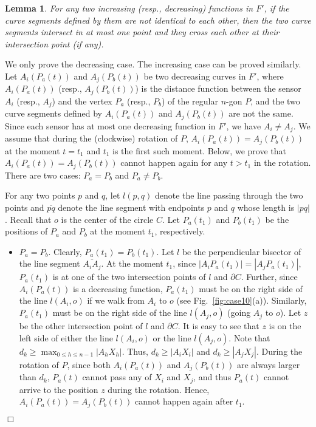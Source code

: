 \documentclass[11pt]{article}
\newenvironment{proof}{\noindent {\textbf{Proof:}}\rm}{\hfill $\Box$
\rm}
\newtheorem{Lem}{Lemma}
\begin{document}
\begin{Lem}\label{lem:30}
For any two increasing (resp., decreasing) functions in $F'$, if the
curve segments defined by them are not identical to each other, then the two curve
segments intersect in at most one point and they cross each other at
their intersection point (if any).
\end{Lem}
\begin{proof}
We only prove the decreasing case. The increasing case can be proved
similarly. Let $A_i(P_a(t))$ and $A_j(P_b(t))$ be two
decreasing curves in $F'$, where $A_i(P_a(t))$ (resp.,
$A_j(P_b(t))$) is the distance function between the sensor $A_i$
(resp., $A_j$) and the vertex $P_a$ (resp., $P_b$) of the regular $n$-gon
$P$, and the two curve segments defined by $A_i(P_a(t))$ and
$A_j(P_b(t))$ are not the same. Since each sensor has at most one
decreasing function in $F'$, we have $A_i\neq A_j$.
We assume that during the (clockwise) rotation of $P$, $A_i(P_a(t))=A_j(P_b(t))$ at the
moment $t=t_1$ and $t_1$ is the first such moment. Below, we prove
that $A_i(P_a(t))=A_j(P_b(t))$ cannot happen again for any $t>t_1$
in the rotation. There are two cases: $P_a=P_b$ and
$P_a\neq P_b$.

For any two points $p$ and $q$, let $l(p,q)$ denote the line passing
through the two points and $\overline{pq}$ denote the line segment with
endpoints $p$ and $q$ whose length is $|pq|$.
Recall that $o$ is the center of the circle $C$. Let $P_a(t_1)$ and
$P_b(t_1)$ be the positions of $P_a$ and $P_b$ at the moment $t_1$,
respectively.


\begin{itemize}
\item
$P_a=P_b$. Clearly, $P_a(t_1)=P_b(t_1)$.
Let $l$ be the perpendicular bisector of the line
segment $\overline{A_iA_j}$. At the moment $t_1$, since
$|A_iP_a(t_1)|=|A_jP_a(t_1)|$, $P_a(t_1)$ is at one of the two intersection points of
$l$ and $\partial C$. Further, since $A_i(P_a(t))$ is a decreasing
function, $P_a(t_1)$ must be on the right side of the line $l(A_i,o)$ if
we walk from $A_i$ to $o$ (see Fig.~\ref{fig:case10}(a)). Similarly, $P_a(t_1)$
must be on the right side of the line $l(A_j,o)$ (going $A_j$ to $o$). Let $z$ be the
other intersection point of $l$ and $\partial C$. It is easy to see that
$z$ is on the left side of either the line $l(A_i,o)$ or the line
$l(A_j,o)$. Note that $d_k\geq \max_{0\leq h\leq n-1}|A_hX_h|$.
Thus, $d_k\geq |A_iX_i|$ and $d_k\geq |A_jX_j|$. During the rotation of $P$,
since both $A_i(P_a(t))$ and $A_j(P_b(t))$ are always larger than
$d_k$, $P_a(t)$ cannot pass any of $X_i$ and $X_j$, and thus $P_a(t)$
cannot arrive to the position $z$ during the rotation. Hence,
$A_i(P_a(t))=A_j(P_b(t))$ cannot happen again after $t_1$.


\end{itemize}
\end{proof}
\end{document}
